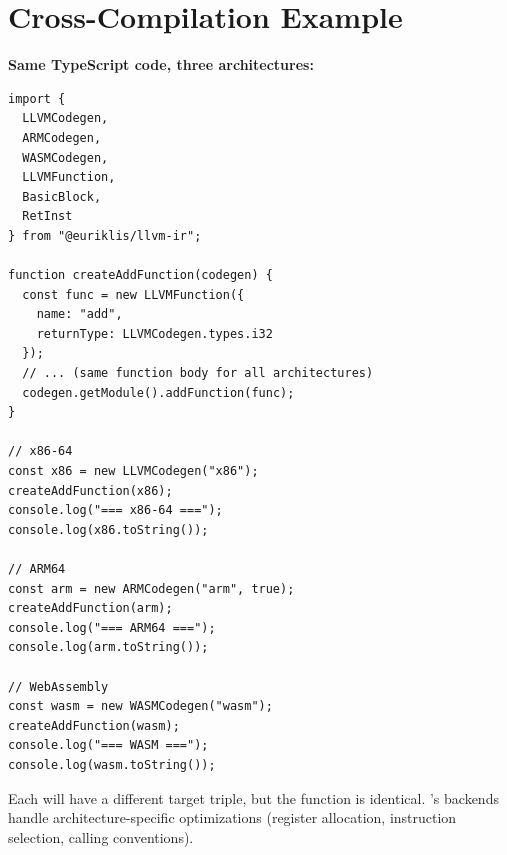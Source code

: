 \section{Cross-Compilation Example}

\textbf{Same TypeScript code, three architectures:}

\begin{lstlisting}[style=ts]
import {
  LLVMCodegen,
  ARMCodegen,
  WASMCodegen,
  LLVMFunction,
  BasicBlock,
  RetInst
} from "@euriklis/llvm-ir";

function createAddFunction(codegen) {
  const func = new LLVMFunction({
    name: "add",
    returnType: LLVMCodegen.types.i32
  });
  // ... (same function body for all architectures)
  codegen.getModule().addFunction(func);
}

// x86-64
const x86 = new LLVMCodegen("x86");
createAddFunction(x86);
console.log("=== x86-64 ===");
console.log(x86.toString());

// ARM64
const arm = new ARMCodegen("arm", true);
createAddFunction(arm);
console.log("=== ARM64 ===");
console.log(arm.toString());

// WebAssembly
const wasm = new WASMCodegen("wasm");
createAddFunction(wasm);
console.log("=== WASM ===");
console.log(wasm.toString());
\end{lstlisting}

Each will have a different target triple, but the function  is identical. 's backends handle architecture-specific optimizations (register allocation, instruction selection, calling conventions).

